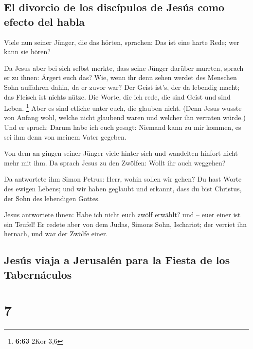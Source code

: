 \hypertarget{el-divorcio-de-los-discuxedpulos-de-jesuxfas-como-efecto-del-habla}{%
\subsection{El divorcio de los discípulos de Jesús como efecto del
habla}\label{el-divorcio-de-los-discuxedpulos-de-jesuxfas-como-efecto-del-habla}}

 Viele nun seiner Jünger, die das hörten, sprachen: Das
ist eine harte Rede; wer kann sie hören?

 Da Jesus aber bei sich selbst merkte, dass seine Jünger
darüber murrten, sprach er zu ihnen: Ärgert euch das? 
Wie, wenn ihr denn sehen werdet des Menschen Sohn auffahren dahin, da er
zuvor war?  Der Geist ist's, der da lebendig macht; das
Fleisch ist nichts nütze. Die Worte, die ich rede, die sind Geist und
sind Leben. \footnote{\textbf{6:63} 2Kor 3,6}  Aber es
sind etliche unter euch, die glauben nicht. (Denn Jesus wusste von
Anfang wohl, welche nicht glaubend waren und welcher ihn verraten
würde.)  Und er sprach: Darum habe ich euch gesagt:
Niemand kann zu mir kommen, es sei ihm denn von meinem Vater gegeben.

 Von dem an gingen seiner Jünger viele hinter sich und
wandelten hinfort nicht mehr mit ihm.  Da sprach Jesus zu
den Zwölfen: Wollt ihr auch weggehen?

 Da antwortete ihm Simon Petrus: Herr, wohin sollen wir
gehen? Du hast Worte des ewigen Lebens;  und wir haben
geglaubt und erkannt, dass du bist Christus, der Sohn des lebendigen
Gottes.

 Jesus antwortete ihnen: Habe ich nicht euch zwölf
erwählt? und -- euer einer ist ein Teufel!  Er redete
aber von dem Judas, Simons Sohn, Ischariot; der verriet ihn hernach, und
war der Zwölfe einer.

\hypertarget{jesuxfas-viaja-a-jerusaluxe9n-para-la-fiesta-de-los-tabernuxe1culos}{%
\subsection{Jesús viaja a Jerusalén para la Fiesta de los
Tabernáculos}\label{jesuxfas-viaja-a-jerusaluxe9n-para-la-fiesta-de-los-tabernuxe1culos}}

\hypertarget{section-6}{%
\section{7}\label{section-6}}

